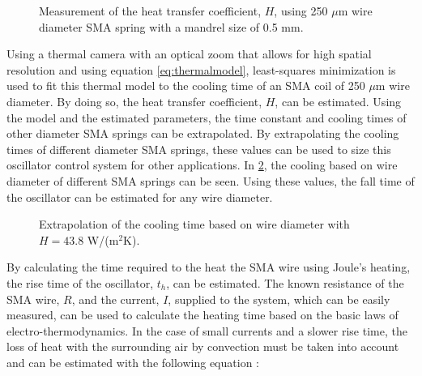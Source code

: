 \begin{figure}[htb!] %
  \centering
  \resizebox{0.8\textwidth}{!}{}
  \caption[Measurement of the heat transfer coefficient, $H$]{Measurement of the heat transfer coefficient, $H$, using 250 $\mu$m wire diameter SMA spring with a mandrel size of 0.5 mm.}
  \label{fig:thermal-fitting}
\end{figure}

Using a thermal camera with an optical zoom that allows for high spatial resolution and using equation \ref{eq:thermalmodel}, least-squares minimization is used to fit this thermal model to the cooling time of an SMA coil of 250 $\mu$m wire diameter. By doing so, the heat transfer coefficient, $H$, can be estimated. Using the model and the estimated parameters, the time constant and cooling times of other diameter SMA springs can be extrapolated. By extrapolating the cooling times of different diameter SMA springs, these values can be used to size this oscillator control system for other applications. In \cref{fig:cooling-time-extrapolation}, the cooling based on wire diameter of different SMA springs can be seen. Using these values, the fall time of the oscillator can be estimated for any wire diameter.

\begin{figure}[htb!] %
  \centering
  \resizebox{0.65\textwidth}{!}{}
  \caption[Extrapolation of the cooling time based on wire diameter]{Extrapolation of the cooling time based on wire diameter with $H = 43.8$ W/(m$^2$K).}
  \label{fig:cooling-time-extrapolation}
\end{figure}

By calculating the time required to the heat the SMA wire using Joule's heating, the rise time of the oscillator, $t_h$, can be estimated. The known resistance of the SMA wire, $R$, and the current, $I$, supplied to the system, which can be easily measured, can be used to calculate the heating time based on the basic laws of electro-thermodynamics. In the case of small currents and a slower rise time, the loss of heat with the surrounding air by convection must be taken into account and can be estimated with the following equation :

